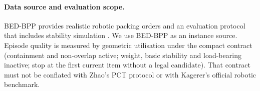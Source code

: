 \paragraph{Data source and evaluation scope.}
BED-BPP provides realistic robotic packing orders and an evaluation protocol that
includes stability simulation \citep{kagerer2023bedbpp}. We use BED-BPP as an
instance source. Episode quality is measured by geometric utilisation under the
compact contract (containment and non-overlap active; weight, basic stability and
load-bearing inactive; stop at the first current item without a legal candidate).
That contract must not be conflated with Zhao's PCT protocol or with Kagerer's
official robotic benchmark.
